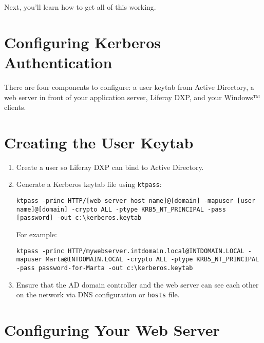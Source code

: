 Next, you'll learn how to get all of this working.

\section{Configuring Kerberos
Authentication}\label{configuring-kerberos-authentication}

There are four components to configure: a user keytab from Active
Directory, a web server in front of your application server, Liferay
DXP, and your Windows™ clients.

\section{Creating the User Keytab}\label{creating-the-user-keytab}

\begin{enumerate}
\def\labelenumi{\arabic{enumi}.}
\item
  Create a user so Liferay DXP can bind to Active Directory.
\item
  Generate a Kerberos keytab file using \texttt{ktpass}:

\begin{verbatim}
ktpass -princ HTTP/[web server host name]@[domain] -mapuser [user name]@[domain] -crypto ALL -ptype KRB5_NT_PRINCIPAL -pass [password] -out c:\kerberos.keytab
\end{verbatim}

  For example:

\begin{verbatim}
ktpass -princ HTTP/mywebserver.intdomain.local@INTDOMAIN.LOCAL -mapuser Marta@INTDOMAIN.LOCAL -crypto ALL -ptype KRB5_NT_PRINCIPAL -pass password-for-Marta -out c:\kerberos.keytab
\end{verbatim}
\item
  Ensure that the AD domain controller and the web server can see each
  other on the network via DNS configuration or \texttt{hosts} file.
\end{enumerate}

\section{Configuring Your Web Server}\label{configuring-your-web-server}

